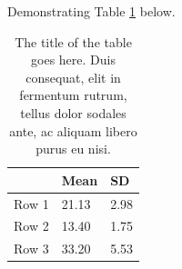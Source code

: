 Demonstrating Table \ref{tab:table_example1} below.
\begin{table}[tbh]
\caption[The title of the table goes here. Duis consequat, elit in fermentum rutrum, tellus dolor sodales ante, ac aliquam libero purus eu nisi.]{The title of the table goes here. Duis consequat, elit in fermentum rutrum, tellus dolor sodales ante, ac aliquam libero purus eu nisi.}
\label{tab:table_example1}
\begin{center}
\begin{tabular}{lll}
      & Mean  & SD   \\ \hline
Row 1 & 21.13 & 2.98 \\ 
Row 2 & 13.40 & 1.75 \\ 
Row 3 & 33.20 & 5.53 \\ \hline
\end{tabular}
\end{center}
\end{table}